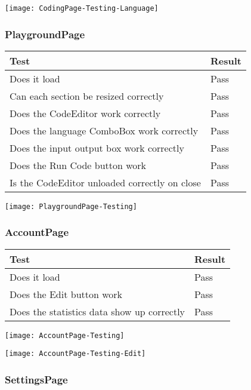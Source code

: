 \documentclass[report.tex]{subfiles}
\begin{document}
\texttt{[image: CodingPage-Testing-Language]}

\subsubsection{PlaygroundPage}

\begin{tabulary}{\linewidth}{|L|l|}
    \hline
    Test & Result \\
    \hline
    Does it load & Pass \\
    \hline
    Can each section be resized correctly & Pass \\
    \hline
    Does the CodeEditor work correctly & Pass \\
    \hline
    Does the language ComboBox work correctly & Pass \\
    \hline
    Does the input output box work correctly & Pass \\
    \hline
    Does the Run Code button work & Pass \\
    \hline
    Is the CodeEditor unloaded correctly on close & Pass \\
    \hline
\end{tabulary}

\texttt{[image: PlaygroundPage-Testing]}

\subsubsection{AccountPage}

\begin{tabulary}{\linewidth}{|L|l|}
    \hline
    Test & Result\\
    \hline
    Does it load & Pass \\
    \hline
    Does the Edit button work & Pass \\
    \hline
    Does the statistics data show up correctly & Pass \\
    \hline
\end{tabulary}

\texttt{[image: AccountPage-Testing]}

\texttt{[image: AccountPage-Testing-Edit]}

\subsubsection{SettingsPage}
\end{document}
